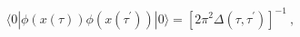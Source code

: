 \begin{equation} \label{l81-02}
 \langle 0|\phi(x(\tau))\phi(x(\tau ^{'}))|0\rangle =%
[2\pi ^2\Delta (\tau , \tau ^{'})]^{-1}~,
\end{equation}


